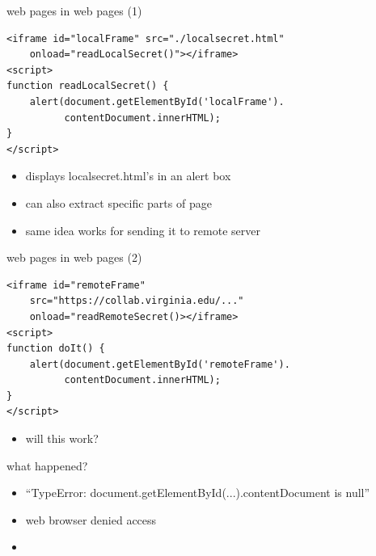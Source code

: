 
\begin{frame}[fragile,label=webInWeb]{web pages in web pages (1)}
    \vspace{-.25cm}
\begin{verbatim}
<iframe id="localFrame" src="./localsecret.html"
    onload="readLocalSecret()"></iframe>
<script>
function readLocalSecret() {
    alert(document.getElementById('localFrame').
          contentDocument.innerHTML);
}
</script>
\end{verbatim}
    \vspace{-.25cm}
    \begin{itemize}
    \item displays localsecret.html's  in an alert box
    \item can also extract specific parts of page
    \item same idea works for sending it to remote server
    \end{itemize}
\end{frame}

\begin{frame}[fragile,label=webInWebOther]{web pages in web pages (2)}
    \vspace{-.25cm}
    \setlength{\parskip}{-0.5\baselineskip}
\begin{verbatim}
<iframe id="remoteFrame"
    src="https://collab.virginia.edu/..."
    onload="readRemoteSecret()></iframe>
<script>
function doIt() {
    alert(document.getElementById('remoteFrame').
          contentDocument.innerHTML);
}
</script>
\end{verbatim}
    \begin{itemize}
    \item will this work?
    \end{itemize}
\end{frame}

\begin{frame}{what happened?}
    \begin{itemize}
        \item ``TypeError: document.getElementById(...).contentDocument is null''
        \item web browser denied access
        \vspace{.5cm}
    \item {}
    \end{itemize}
\end{frame}


